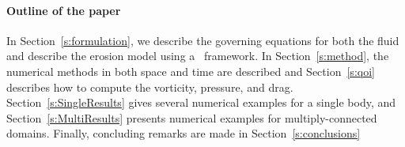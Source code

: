 \documentclass[preprint, 10pt]{elsarticle}
\begin{document}
\paragraph{Outline of the paper} In Section~\ref{s:formulation}, we
describe the governing equations for both the fluid and describe the
erosion model using a \thL~framework.  In Section~\ref{s:method}, the
numerical methods in both space and time are described and
Section~\ref{s:qoi} describes how to compute the vorticity, pressure,
and drag. Section~\ref{s:SingleResults} gives several numerical examples
for a single body, and Section~\ref{s:MultiResults} presents numerical
examples for multiply-connected domains.  Finally, concluding remarks
are made in Section~\ref{s:conclusions}

\end{document}
